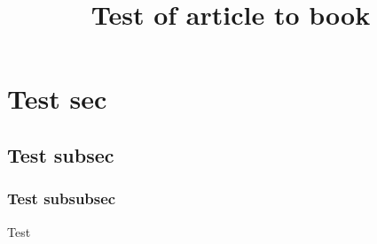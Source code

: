 \documentclass{article}
\title{Test of article to book}
\begin{document}
    
    
    
    \section{Test sec}
    \subsection{Test subsec}
    \subsubsection{Test subsubsec}
    Test
\end{document}
